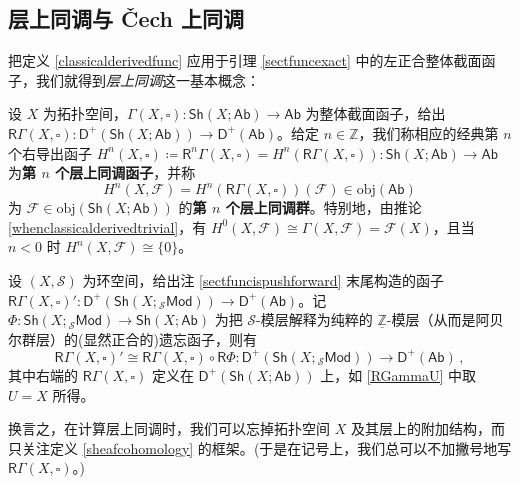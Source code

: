 \subsection{层上同调与 \v{C}ech 上同调}\label{ch6.2}

把定义 \ref{classicalderivedfunc} 应用于引理 \ref{sectfuncexact} 中的左正合整体截面函子，我们就得到\textit{层上同调}这一基本概念：

\begin{Def}\label{sheafcohomology}
设 $X$ 为拓扑空间，$\Gamma(X,\square):\mathsf{Sh}(X;\mathsf{Ab})\rightarrow\mathsf{Ab}$ 为整体截面函子，给出 $\mathsf{R}\Gamma(X,\square):\mathsf{D^+}(\mathsf{Sh}(X;\mathsf{Ab}))\rightarrow \mathsf{D^+}(\mathsf{Ab})$。给定 $n\in\mathbb{Z}$，我们称相应的经典第 $n$ 个右导出函子 $H^n(X,\square)\coloneqq \mathsf{R}^n\Gamma(X,\square)= H^n(\mathsf{R}\Gamma(X,\square)):\mathsf{Sh}(X;\mathsf{Ab})\rightarrow\mathsf{Ab}$ 为\textbf{第 $n$ 个层上同调函子}，并称
\begin{equation}
	H^n(X,\mathcal{F})=H^n(\mathsf{R}\Gamma(X,\square))(\mathcal{F})\in\text{obj}(\mathsf{Ab})
\end{equation}
为 $\mathcal{F}\in\text{obj}(\mathsf{Sh}(X;\mathsf{Ab}))$ 的\textbf{第 $n$ 个层上同调群}。特别地，由推论 \ref{whenclassicalderivedtrivial}，有 $H^0(X,\mathcal{F})\cong\Gamma(X,\mathcal{F})=\mathcal{F}(X)$，且当 $n<0$ 时 $H^n(X,\mathcal{F})\cong\{0\}$。
\end{Def}

\begin{Pro}\label{sheafcohomologyisabelian}
设 $(X,\mathcal{S})$ 为环空间，给出注 \ref{sectfuncispushforward} 末尾构造的函子 $\mathsf{R}\Gamma(X,\square)':\mathsf{D^+}(\mathsf{Sh}(X;{}_{\mathcal{S}}\mathsf{Mod}))\rightarrow \mathsf{D^+}(\mathsf{Ab})$。记 $\Phi:\mathsf{Sh}(X;{}_{\mathcal{S}}\mathsf{Mod})\rightarrow\mathsf{Sh}(X;\mathsf{Ab})$ 为把 $\mathcal{S}$-模层解释为纯粹的 $\underline{\mathbb{Z}}$-模层（从而是阿贝尔群层）的\textup(显然正合的\textup)遗忘函子，则有
\[
\mathsf{R}\Gamma(X,\square)'\cong\mathsf{R}\Gamma(X,\square)\circ\mathsf{R}\Phi:\mathsf{D^+}(\mathsf{Sh}(X;{}_{\mathcal{S}}\mathsf{Mod}))\rightarrow\mathsf{D^+}(\mathsf{Ab})\,,
\]
其中右端的 $\mathsf{R}\Gamma(X,\square)$ 定义在 $\mathsf{D^+}(\mathsf{Sh}(X;\mathsf{Ab}))$ 上，如 \eqref{RGammaU} 中取 $U=X$ 所得。

换言之，在计算层上同调时，我们可以忘掉拓扑空间 $X$ 及其层上的附加结构，而只关注定义 \ref{sheafcohomology} 的框架。\textup(于是在记号上，我们总可以不加撇号地写 $\mathsf{R}\Gamma(X,\square)$。\textup)   
\end{Pro}

